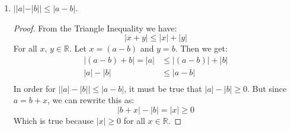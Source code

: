 \documentclass[12pt]{amsart}
\begin{document}
\begin{enumerate}
\begin{enumerate}
\addtocounter{enumii}{2}

\item  $||a|-|b||\leq |a-b|$. 

\begin{proof}
From the Triangle Inequality we have:
\[ |x+y| \leq |x| + |y| \]
For all $x,\,y\in \mathbb R$. Let $x=(a-b)$ and $y=b$. Then we get: 
\begin{align*}
|(a-b)+b| = |a|& \leq |(a-b)| + |b| \\
|a| - |b|& \leq |a-b| \\
\end{align*}
In order for $\left||a| - |b|\right| \leq |a-b|$, it must be true that $|a|-|b| \ge 0$. But since $a = b+x$, we can rewrite this as:
\[ |b+x| - |b| = |x| \ge 0 \]
Which is true because $|x|\ge 0$ for all $x\in\mathbb R$.
\end{proof}
\end{enumerate}

\end{enumerate}
\end{document}
